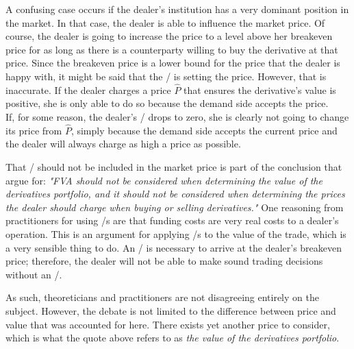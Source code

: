 \documentclass[main.tex]{subfiles}
\begin{document}
    A confusing case occurs if the dealer's institution has a very dominant position in the market.
    In that case, the dealer is able to influence the market price.
    Of course, the dealer is going to increase the price to a level above her breakeven price
    for as long as there is a counterparty willing to buy the derivative at that price.
    Since the breakeven price is a lower bound for the price that the dealer is happy with,
    it might be said that the \FVA/ is setting the price.
    However, that is inaccurate. 
    If the dealer charges a price $\hat{P}$ that ensures the derivative's value is positive,
    she is only able to do so because the demand side accepts the price.
    \\
    If, for some reason, the dealer's \FVA/ drops to zero,
    she is clearly not going to change its price from $\hat{P}$,
    simply because the demand side accepts the current price 
    and the dealer will always charge as high a price as possible.

    That \FVA/ should not be included in the market price 
    is part of the conclusion that \textcite{HullWhite2012FVA} argue for: 
    \textit{
        "FVA should not be considered when determining the value of the 
        derivatives portfolio, and it should not be considered when determining the prices 
        the dealer should charge when buying or selling derivatives."
    }
    One reasoning from practitioners for using \FVA/s are 
    that funding costs are very real costs to a dealer's operation.
    This is an argument for applying \FVA/s to the value of the trade,
    which is a very sensible thing to do.
    An \FVA/ is necessary to arrive at the dealer's breakeven price;
    therefore, the dealer will not be able to make sound trading decisions without an \FVA/.
    
    As such, theoreticians and practitioners are not disagreeing entirely on the subject.
    However, the debate is not limited to the difference between price and value
    that was accounted for here. 
    There exists yet another price to consider, which is what the quote above 
    refers to as \textit{the value of the derivatives portfolio}.
\end{document}
